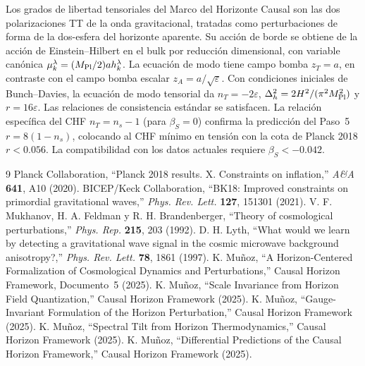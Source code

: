 \documentclass[12pt,a4paper]{article}
\begin{document}
Los grados de libertad tensoriales del Marco del Horizonte Causal son las dos polarizaciones TT de la onda gravitacional, tratadas como perturbaciones de forma de la dos-esfera del horizonte aparente. Su acción de borde se obtiene de la acción de Einstein--Hilbert en el bulk por reducción dimensional, con variable canónica $\mu_k^\lambda = (M_{\rm Pl}/2)a h_k^\lambda$. La ecuación de modo tiene campo bomba $z_T = a$, en contraste con el campo bomba escalar $z_A = a/\sqrt\varepsilon$. Con condiciones iniciales de Bunch--Davies, la ecuación de modo tensorial da $n_T = -2\varepsilon$, $\Delta_h^2 = 2H^2/(\pi^2 M_{\rm Pl}^2)$ y $r = 16\varepsilon$. Las relaciones de consistencia estándar se satisfacen. La relación específica del CHF $n_T = n_s - 1$ (para $\beta_S = 0$) confirma la predicción del Paso~5 $r = 8(1-n_s)$, colocando al CHF mínimo en tensión con la cota de Planck 2018 $r < 0.056$. La compatibilidad con los datos actuales requiere $\beta_S < -0.042$.

\begin{thebibliography}{9}
 Planck Collaboration, ``Planck 2018 results. X. Constraints on inflation,'' \textit{A\&A} \textbf{641}, A10 (2020).
 BICEP/Keck Collaboration, ``BK18: Improved constraints on primordial gravitational waves,'' \textit{Phys. Rev. Lett.} \textbf{127}, 151301 (2021).
 V. F. Mukhanov, H. A. Feldman y R. H. Brandenberger, ``Theory of cosmological perturbations,'' \textit{Phys. Rep.} \textbf{215}, 203 (1992).
 D. H. Lyth, ``What would we learn by detecting a gravitational wave signal in the cosmic microwave background anisotropy?,'' \textit{Phys. Rev. Lett.} \textbf{78}, 1861 (1997).
 K. Mu\~noz, ``A Horizon-Centered Formalization of Cosmological Dynamics and Perturbations,'' Causal Horizon Framework, Documento~5 (2025).
 K. Mu\~noz, ``Scale Invariance from Horizon Field Quantization,'' Causal Horizon Framework (2025).
 K. Mu\~noz, ``Gauge-Invariant Formulation of the Horizon Perturbation,'' Causal Horizon Framework (2025).
 K. Mu\~noz, ``Spectral Tilt from Horizon Thermodynamics,'' Causal Horizon Framework (2025).
 K. Mu\~noz, ``Differential Predictions of the Causal Horizon Framework,'' Causal Horizon Framework (2025).
\end{thebibliography}
\end{document}
